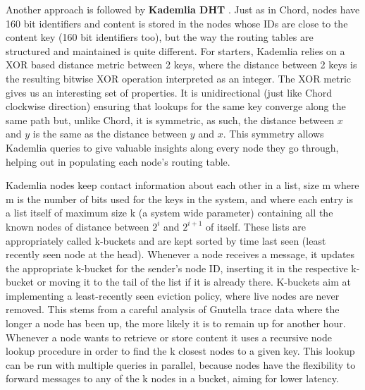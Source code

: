 Another approach is followed by \textbf{Kademlia DHT} \cite{Maymounkov2002}.
Just as in Chord, nodes have 160 bit identifiers and content is
stored in the nodes whose IDs are close to the content key (160 bit
identifiers too), but the way the routing tables are structured and
maintained is quite different. For starters, Kademlia relies on a XOR
based distance metric between 2 keys, where the distance between 2 keys
is the resulting bitwise XOR operation interpreted as an integer. The
XOR metric gives us an interesting set of properties. It is
unidirectional (just like Chord clockwise direction) ensuring that
lookups for the same key converge along the same path but, unlike Chord,
it is symmetric, as such, the distance between $x$ and $y$ is the same as
the distance between $y$ and $x$. This symmetry allows Kademlia queries to
give valuable insights along every node they go through, helping out in
populating each node's routing table.

Kademlia nodes keep contact information about each other in a list, size
m where m is the number of bits used for the keys in the system, and
where each entry is a list itself of maximum size k (a system wide
parameter) containing all the known nodes of distance between $2^{i}$ and
$2^{i+1}$ of itself. These lists
are appropriately called k-buckets and are kept sorted by time last seen
(least recently seen node at the head). Whenever a node receives a
message, it updates the appropriate k-bucket for the sender's node ID,
inserting it in the respective k-bucket or moving it to the tail of the
list if it is already there. K-buckets aim at implementing a
least-recently seen eviction policy, where live nodes are never removed.
This stems from a careful analysis of Gnutella trace data \cite{Saroiu2002}
where the longer a node has been up, the more likely
it is to remain up for another hour. Whenever a node wants to retrieve
or store content it uses a recursive node lookup procedure in order to
find the k closest nodes to a given key. This lookup can be run with
multiple queries in parallel, because nodes have the flexibility to
forward messages to any of the k nodes in a bucket, aiming for lower
latency.

